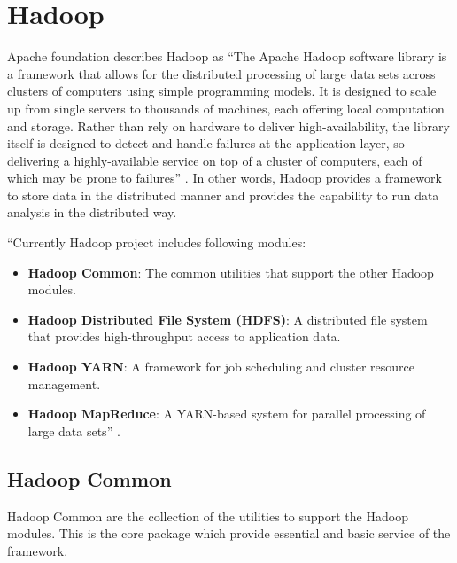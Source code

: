 \documentclass[sigconf]{acmart}
\begin{document}
\section{Hadoop}
Apache foundation describes Hadoop as ``The Apache Hadoop software library is a framework that allows for the distributed processing of large data sets across clusters of computers using simple programming models. It is designed to scale up from single servers to thousands of machines, each offering local computation and storage. Rather than rely on hardware to deliver high-availability, the library itself is designed to detect and handle failures at the application layer, so delivering a highly-available service on top of a cluster of computers, each of which may be prone to failures'' \cite{www-hadoop}. In other words, Hadoop provides a framework to store data in the distributed manner and provides the capability to run data analysis in the distributed way.

``Currently Hadoop project includes following modules:
\begin{itemize}
\item {\bf Hadoop Common}: The common utilities that support the other Hadoop modules.
\item {\bf Hadoop Distributed File System (HDFS)}: A distributed file system that provides high-throughput access to application data.
\item {\bf Hadoop YARN}: A framework for job scheduling and cluster resource management.
\item {\bf Hadoop MapReduce}: A YARN-based system for parallel processing of large data sets'' \cite{www-hadoop}.
\end{itemize}

\subsection{Hadoop Common}
Hadoop Common are the collection of the utilities to support the Hadoop modules. This is the core package which provide essential and basic service of the framework.
\end{document}
